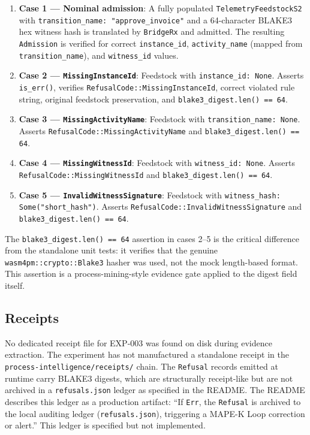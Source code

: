 \begin{enumerate}
  \item \textbf{Case 1 --- Nominal admission}: A fully populated
        \texttt{TelemetryFeedstockS2} with \texttt{transition\_name: "approve\_invoice"}
        and a 64-character BLAKE3 hex witness hash is translated by \texttt{BridgeRx}
        and admitted. The resulting \texttt{Admission} is verified for correct
        \texttt{instance\_id}, \texttt{activity\_name} (mapped from \texttt{transition\_name}),
        and \texttt{witness\_id} values.
  \item \textbf{Case 2 --- \texttt{MissingInstanceId}}: Feedstock with
        \texttt{instance\_id: None}. Asserts \texttt{is\_err()}, verifies
        \texttt{RefusalCode::MissingInstanceId}, correct violated rule string,
        original feedstock preservation, and \texttt{blake3\_digest.len() == 64}.
  \item \textbf{Case 3 --- \texttt{MissingActivityName}}: Feedstock with
        \texttt{transition\_name: None}. Asserts \texttt{RefusalCode::MissingActivityName}
        and \texttt{blake3\_digest.len() == 64}.
  \item \textbf{Case 4 --- \texttt{MissingWitnessId}}: Feedstock with
        \texttt{witness\_id: None}. Asserts \texttt{RefusalCode::MissingWitnessId}
        and \texttt{blake3\_digest.len() == 64}.
  \item \textbf{Case 5 --- \texttt{InvalidWitnessSignature}}: Feedstock with
        \texttt{witness\_hash: Some("short\_hash")}. Asserts
        \texttt{RefusalCode::InvalidWitnessSignature} and \texttt{blake3\_digest.len() == 64}.
\end{enumerate}

The \texttt{blake3\_digest.len() == 64} assertion in cases 2--5 is the critical
difference from the standalone unit tests: it verifies that the genuine
\texttt{wasm4pm::crypto::Blake3} hasher was used, not the mock length-based format.
This assertion is a process-mining-style evidence gate applied to the digest field
itself.

\subsection{Receipts}
\label{sec:otel-weaver-exp-003-live-check-to-refusal-evidence-receipts}

No dedicated receipt file for EXP-003 was found on disk during evidence extraction.
The experiment has not manufactured a standalone receipt in the
\texttt{process-intelligence/receipts/} chain. The \texttt{Refusal} records emitted
at runtime carry BLAKE3 digests, which are structurally receipt-like but are not
archived in a \texttt{refusals.json} ledger as specified in the README. The README
describes this ledger as a production artifact: ``If \texttt{Err}, the \texttt{Refusal}
is archived to the local auditing ledger (\texttt{refusals.json}), triggering a
MAPE-K Loop correction or alert.'' This ledger is specified but not implemented.

